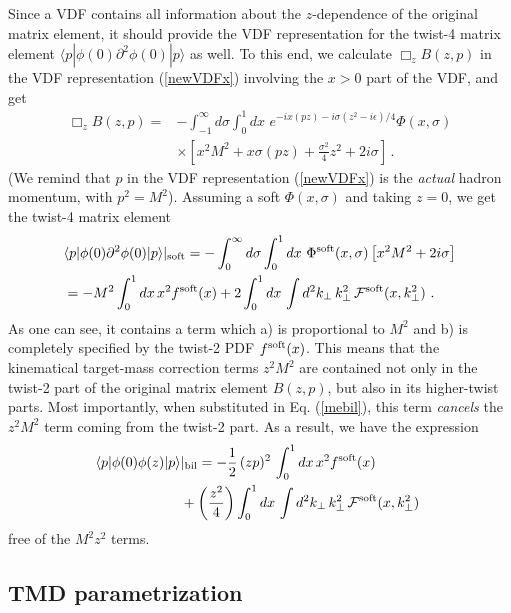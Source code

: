 \documentclass[final,5p,times,twocolumn]{elsarticle}
\newcommand{\nn}{\nonumber \\ }
\begin{document}
Since a VDF contains all  information about   the $z$-dependence of the original matrix element,
it should provide  the VDF representation for the twist-4 matrix element  $ \langle p |  \phi (0)  {\partial}^2 
 \phi(0)   |p \rangle$ as well. 
 To this end, we calculate   $\Box_z  B(z,p)$ in the VDF representation
 (\ref{newVDFx})  involving the $x>0$ part
 of the VDF,  and  get 
  \begin{align}
  \Box_z  B(z,p)  = & -    \int_{-1}^{\infty} d \sigma \int_{0}^1 dx\,  \,  e^{-i x (pz) -i \sigma {(z^2-i \epsilon )}/{4}}
 \Phi (x,\sigma)   \nonumber \\ & \times 
\left [ x^2 M^2   + x\sigma (pz) + \frac{\sigma^2}{4} z^2 + 2i \sigma \right ] 
\,  .
 \label{Baa}
\end{align} 
(We remind that $p$ in the VDF representation
(\ref{newVDFx})   is the {\it actual} hadron momentum, with
$p^2=M^2$). 
Assuming a soft $\Phi (x,\sigma)$ and taking $z=0$, we get the twist-4 matrix element
 \begin{align}
& \langle p |  \phi (0)  \partial^2  \phi( 0)|p \rangle|_{\rm soft} = 
 -  \int_{0}^{\infty} d \sigma \int_{0}^1 dx\,  \, 
 \Phi^{\rm soft} (x,\sigma)  
\left [ x^2 M^2   + 2i \sigma \right ] 
  \nonumber \\ & = - M^2 \int_0^1 dx\,  x^2 f^{\rm soft}(x) + 2
 \int_{0}^1 dx\,     \int  d^2 k_\perp \,  k_\perp^2\,
 {\cal F}^{\rm soft} (x, k_\perp^2) \ . 
 \label{d2}
\end{align} 
As one can see, it contains a term which  a) is proportional to $M^2$ 
and b) is completely specified by the twist-2 PDF $f^{\rm soft}(x)$.
This means that the kinematical target-mass correction terms  $z^2M^2$   are  contained not 
only in the twist-2 part of the original  matrix element $B(z,p)$, but also 
in its higher-twist parts. 
Most importantly, when substituted   in Eq. (\ref{mebil}), this term {\it cancels}  the
$z^2 M^2$  term coming from the twist-2 part. 
As a result, we have the expression  
  \begin{align}
\langle p |  \phi (0) \phi(z) |p \rangle &|_{\rm bil}  =  
 -  \frac12 \, (zp )^{2} \,  \int_0^1 dx\,  x^2 f^{\rm soft}(x) 
  \nn & 
  +
 \left ( \frac{z^2 }{4}  \right )  \int_{0}^1 dx\,     \int  d^2 k_\perp \,  k_\perp^2\,
 {\cal F}^{\rm soft} (x, k_\perp^2) 
 \  
  \label{mebilF}
\end{align}
free of the $M^2 z^2$ terms. 

\subsection{TMD parametrization} 
\end{document}
